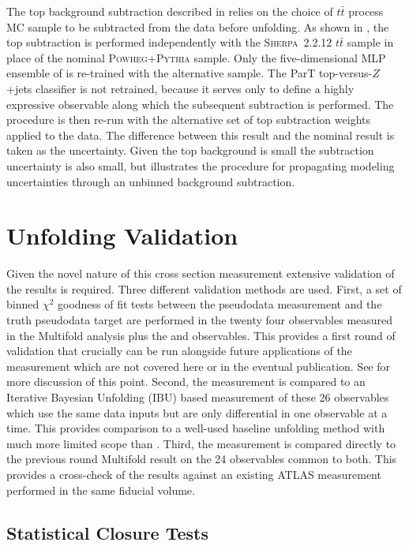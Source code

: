 The top background subtraction described in  relies on the choice of $t\bar{t}$ process MC sample to be subtracted from the data before unfolding.
As shown in , the top subtraction is performed independently with the \textsc{Sherpa}~2.2.12 $t\bar{t}$ sample in place of the nominal \textsc{Powheg}+\textsc{Pythia} sample.
Only the five-dimensional MLP ensemble of  is re-trained with the alternative sample.
The ParT top-versus-$Z$+jets classifier is not retrained, because it serves only to define a highly expressive observable along which the subsequent subtraction is performed.
The \Omnifold procedure is then re-run with the alternative set of top subtraction weights applied to the data.
The difference between this result and the nominal result is taken as the uncertainty.
Given the top background is small the subtraction uncertainty is also small, but illustrates the procedure for propagating modeling uncertainties through an unbinned background subtraction.

\section{Unfolding Validation}
\label{sec:zjets-validation}

Given the novel nature of this cross section measurement extensive validation of the results is required.
Three different validation methods are used.
First, a set of binned $\chi^2$ goodness of fit tests between the pseudodata measurement and the truth pseudodata target are performed in the twenty four observables measured in the Multifold analysis plus the \nch and \HT observables.
This provides a first round of validation that crucially can be run alongside future applications of the measurement which are not covered here or in the eventual publication.
See  for more discussion of this point.
Second, the measurement is compared to an Iterative Bayesian Unfolding (IBU) based measurement of these 26 observables which use the same data inputs but are only differential in one observable at a time.
This provides comparison to a well-used baseline unfolding method with much more limited scope than \Omnifold.
Third, the measurement is compared directly to the previous round Multifold result on the 24 observables common to both.
This provides a cross-check of the results against an existing ATLAS measurement performed in the same fiducial volume.

\subsection{Statistical Closure Tests}
\label{sec:zjets-validation-chi2}

